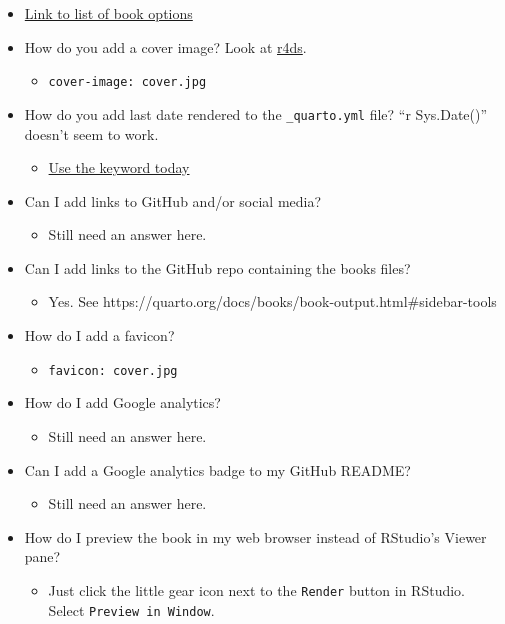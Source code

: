 \documentclass[
  letterpaper,
  DIV=11,
  numbers=noendperiod]{scrreprt}
\providecommand{\tightlist}{%
  \setlength{\itemsep}{0pt}\setlength{\parskip}{0pt}}\usepackage{longtable,booktabs,array}
\begin{document}
\begin{itemize}
\item
  \href{https://quarto.org/docs/reference/projects/books.html}{Link to
  list of book options}
\item
  How do you add a cover image? Look at
  \href{https://github.com/hadley/r4ds/}{r4ds}.

  \begin{itemize}
  \tightlist
  \item
    \texttt{cover-image:\ cover.jpg}
  \end{itemize}
\item
  How do you add last date rendered to the \texttt{\_quarto.yml} file?
  ``r Sys.Date()'' doesn't seem to work.

  \begin{itemize}
  \tightlist
  \item
    \href{https://biostats-r.github.io/biostats/quarto/03-elements-quarto-document.html}{Use
    the keyword today}
  \end{itemize}
\item
  Can I add links to GitHub and/or social media?

  \begin{itemize}
  \tightlist
  \item
    Still need an answer here.
  \end{itemize}
\item
  Can I add links to the GitHub repo containing the books files?

  \begin{itemize}
  \tightlist
  \item
    Yes. See
    https://quarto.org/docs/books/book-output.html\#sidebar-tools
  \end{itemize}
\item
  How do I add a favicon?

  \begin{itemize}
  \tightlist
  \item
    \texttt{favicon:\ cover.jpg}
  \end{itemize}
\item
  How do I add Google analytics?

  \begin{itemize}
  \tightlist
  \item
    Still need an answer here.
  \end{itemize}
\item
  Can I add a Google analytics badge to my GitHub README?

  \begin{itemize}
  \tightlist
  \item
    Still need an answer here.
  \end{itemize}
\item
  How do I preview the book in my web browser instead of RStudio's
  Viewer pane?

  \begin{itemize}
  \tightlist
  \item
    Just click the little gear icon next to the \texttt{Render} button
    in RStudio. Select \texttt{Preview\ in\ Window}.
  \end{itemize}
\end{itemize}
\end{document}
